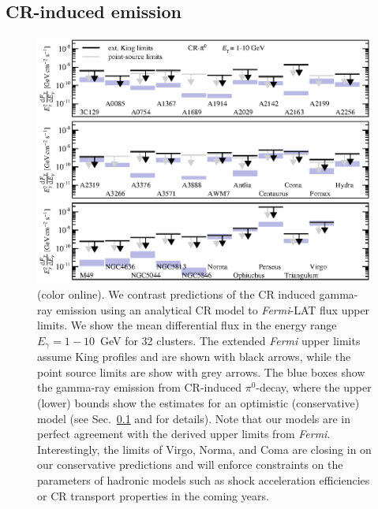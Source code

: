 \documentclass[10pt,aps,pra,reprint,amsmath,amsfonts,amssymb,showpacs,nofootinbib,floatfix]{revtex4-1}
\newcommand{\Fermi}{{\em Fermi}\xspace}
\newcommand{\colo}{(color online). }
\begin{document}
{\subsection{CR-induced emission}
\label{sec:CRemission}
\begin{figure}
\begin{minipage}{2.0\columnwidth}
  \includegraphics[width=0.99\columnwidth]{figures/Fermi.comp.CR.diff.eps}
  \caption{\colo We contrast predictions of the CR
    induced gamma-ray emission using an analytical CR model \protect
    \cite{2010MNRAS.409..449P} to \Fermi-LAT flux upper limits. We
    show the mean differential flux in the energy range
    $E_\gamma=1-10$~GeV for 32 clusters. The extended \Fermi upper
    limits assume King profiles and are shown with black arrows, while
    the point source limits are show with grey arrows. The blue boxes
    show the gamma-ray emission from CR-induced $\pi^0$-decay, where
    the upper (lower) bounds show the estimates for an optimistic
    (conservative) model (see Sec.~\ref{sec:CRemission} and
    \cite{2010MNRAS.409..449P} for details). Note that our models are
    in perfect agreement with the derived upper limits from
    \Fermi. Interestingly, the limits of Virgo, Norma, and Coma are
    closing in on our conservative predictions and will enforce
    constraints on the parameters of hadronic models such as shock
    acceleration efficiencies or CR transport properties in the coming
    years.}
 \label{fig15}
\end{minipage}
\end{figure}

}
\end{document}
